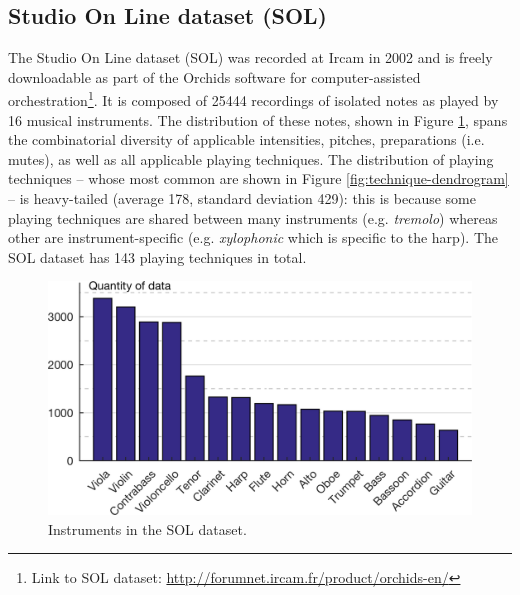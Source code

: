 \documentclass{article}
\makeatletter
\newcommand*{\eg}{e.g.\@\xspace}
\newcommand*{\ie}{i.e.\@\xspace}
\makeatother
\begin{document}
\subsection{Studio On Line dataset (SOL)}

The Studio On Line dataset (SOL) was recorded at Ircam in 2002 and is freely downloadable as part of the Orchids software for computer-assisted orchestration\footnote{Link to SOL dataset: \url{http://forumnet.ircam.fr/product/orchids-en/}}.
It is composed of 25444 recordings of isolated notes as played by 16 musical instruments.
The distribution of these notes, shown in Figure \ref{fig:instrument-histogram}, spans the combinatorial diversity of applicable intensities, pitches, preparations (\ie{} mutes), as well as all applicable playing techniques.
The distribution of playing techniques -- whose most common are shown in Figure \ref{fig:technique-dendrogram} -- is heavy-tailed (average 178, standard deviation 429): this is because some playing techniques are shared between many instruments (\eg{} \textit{tremolo}) whereas other are instrument-specific (\eg{} \textit{xylophonic} which is specific to the harp).
The SOL dataset has 143 playing techniques in total.

\begin{figure}[t!]
\centering
\includegraphics[width=\linewidth]{./figs/histogram/histogram_instruments.png}
\caption{Instruments in the SOL dataset.}
\label{fig:instrument-histogram}
\end{figure}
\end{document}
